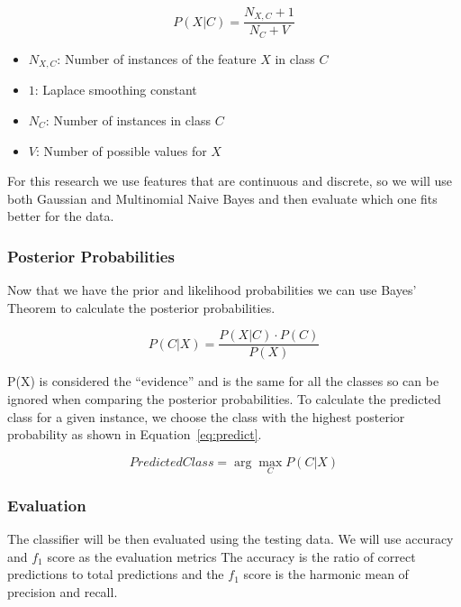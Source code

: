 \documentclass{article}
\begin{document}
\begin{equation}
    \label{eq:multinomial}
    P(X | C) = \frac{N_{X,C} + 1}{N_C + V}
\end{equation}

\begin{itemize}
    \item $N_{X,C}$: Number of instances of the feature $X$ in class $C$
    \item $1$: Laplace smoothing constant
    \item $N_C$: Number of instances in class $C$
    \item $V$: Number of possible values for $X$
\end{itemize}

For this research we use features that are continuous and discrete, so we will use both Gaussian and Multinomial Naive Bayes
and then evaluate which one fits better for the data.

\subsubsection{Posterior Probabilities}
\label{sec:posterior}
Now that we have the prior and likelihood probabilities we can use Bayes' Theorem to calculate the posterior probabilities.

\begin{equation}
    \label{eq:posterior}
    P(C | X) = \frac{P(X | C) \cdot P(C)}{P(X)}
\end{equation}

P(X) is considered the ``evidence'' and is the same for all the classes so can be ignored when
comparing the posterior probabilities.
To calculate the predicted class for a given instance, we choose the class with the highest posterior probability
as shown in Equation~\ref{eq:predict}.

\begin{equation}
    \label{eq:predict}
    Predicted Class = \arg\max_{C} P(C | X)
\end{equation}

\subsubsection{Evaluation}
\label{sec:evaluation}
The classifier will be then evaluated using the testing data. We will use accuracy and $f_1$ score as 
the evaluation metrics The accuracy is the ratio of correct predictions to total predictions and the $f_1$ score
is the harmonic mean of precision and recall. 
\end{document}
